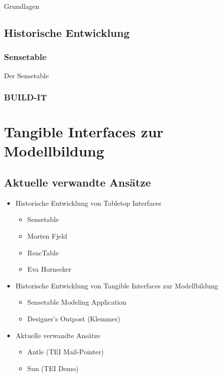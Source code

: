 Grundlagen

\subsection{Historische Entwicklung} %
\label{sub:historische_entwicklung_von_tabletop_interfaces}

\subsubsection{Sensetable} %
\label{subs:sensetable}
Der Sensetable \citep{Patten01}

\subsubsection{BUILD-IT} %
\label{par:build_it}
\citep{Fjeld01}

\section{Tangible Interfaces zur Modellbildung} %
\label{sub:tangible_interfaces_zur_modellbildung}


\subsection{Aktuelle verwandte Ansätze} %
\label{sub:aktuelle_verwandte_ansätze}

\begin{itemize}
	\item Historische Entwicklung von Tabletop Interfaces
	\begin{itemize}
		\item Sensetable
		\item Morten Fjeld
		\item ReacTable
		\item Eva Hornecker
	\end{itemize}
	\item Historische Entwicklung von Tangible Interfaces zur Modellbildung
	\begin{itemize}
		\item Sensetable Modeling Application
		\item Designer's Outpost (Klemmer)
	\end{itemize}
	\item Aktuelle verwandte Ansätze
	\begin{itemize}
		\item Antle (TEI Mail-Pointer)
		\item Sun (TEI Demo)
	\end{itemize}
\end{itemize}




